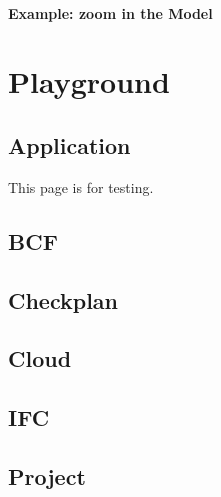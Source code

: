 \documentclass[a4paper,12pt,english]{sphinxmanual}
\begin{document}
\subsubsection{Example: zoom in the Model}
\label{\detokenize{viewer/zoom_in_the_model:example-zoom-in-the-model}}\label{\detokenize{viewer/zoom_in_the_model::doc}}

\chapter{Playground}
\label{\detokenize{api_playground/index:playground}}\label{\detokenize{api_playground/index::doc}}

\section{Application}
\label{\detokenize{api_playground/application_endpoint:application}}\label{\detokenize{api_playground/application_endpoint::doc}}
This page is for testing.


\section{BCF}
\label{\detokenize{api_playground/bcf_endpoint:bcf}}\label{\detokenize{api_playground/bcf_endpoint::doc}}

\section{Checkplan}
\label{\detokenize{api_playground/checkplan_endpoint:checkplan}}\label{\detokenize{api_playground/checkplan_endpoint::doc}}

\section{Cloud}
\label{\detokenize{api_playground/cloud_endpoint:cloud}}\label{\detokenize{api_playground/cloud_endpoint::doc}}

\section{IFC}
\label{\detokenize{api_playground/ifc_endpoint:ifc}}\label{\detokenize{api_playground/ifc_endpoint::doc}}

\section{Project}
\label{\detokenize{api_playground/project_endpoint:project}}\label{\detokenize{api_playground/project_endpoint::doc}}
\end{document}
